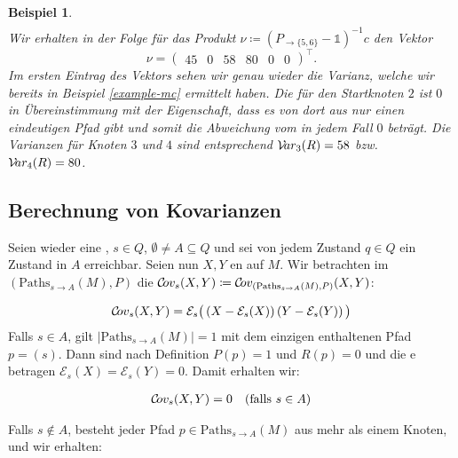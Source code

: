 \documentclass[a4paper]{article}
\newtheorem{beispiel}[satz]{Beispiel}
\theoremstyle{nonumberplain}
\begin{document}
\begin{beispiel}
\begin{align*}
	\end{align*}
	Wir erhalten in der Folge für das Produkt $\nu \coloneqq (P_{\rightarrow \{5,6\}} - \mathbb{1})^{-1}c$ den Vektor
	\begin{equation*}
	\nu = \begin{pmatrix} 45 & 0 & 58 & 80 & 0 & 0 \end{pmatrix}^\intercal\text{.}
	\end{equation*}
	Im ersten Eintrag des Vektors sehen wir genau wieder die Varianz, welche wir bereits in Beispiel \ref{example-mc} ermittelt haben. Die \var{} für den Startknoten $2$ ist $0$ in Übereinstimmung mit der Eigenschaft, dass es von dort aus nur einen eindeutigen Pfad gibt und somit die Abweichung vom \expect{} in jedem Fall $0$ beträgt. Die Varianzen für Knoten $3$ und $4$ sind entsprechend $\mathcal{V}\!ar_3(R) = 58$ bzw. $\mathcal{V}\!ar_4(R) = 80$.
	
\end{beispiel}

\subsection{Berechnung von Kovarianzen}

Seien wieder \mcex{} eine \mc{}, $s \in Q$, $\emptyset \neq A \subseteq Q$ und sei von jedem Zustand $q\in Q$ ein Zustand in $A$ erreichbar. Seien nun $X, Y$ \reward{}en auf $M$. Wir betrachten im \probspacen{} $(\mathrm{Paths}_{s \rightarrow A}(M), P)$ die \cov{} $\mathcal{C}\!ov_s(X,Y) \coloneqq \mathcal{C}\!ov_{(\mathrm{Paths}_{s \rightarrow A}(M), P)}(X,Y)$:

\begin{equation}
\mathcal{C}\!ov_{s}(X,Y) = \mathcal{E}_{s}\big(\left(X - \mathcal{E}_{s} (X)\right)\left(Y - \mathcal{E}_{s} (Y)\right)\big)
\end{equation}
Falls $s \in A$, gilt $|\mathrm{Paths}_{s \rightarrow A}(M)| = 1$ mit dem einzigen enthaltenen Pfad $p = (s)$. Dann sind nach Definition $P(p) = 1$ und $R(p) = 0$ und die \expect{}e betragen $\mathcal{E}_{s}(X) = \mathcal{E}_{s}(Y) = 0$. Damit erhalten wir:

\begin{align}
\mathcal{C}\!ov_{s}(X,Y) = 0 && \text{(falls $s \in A$)}\label{cov_trivial}
\end{align}

Falls $s \notin A$, besteht jeder Pfad $p \in \mathrm{Paths}_{s \rightarrow A}(M)$ aus mehr als einem Knoten, und wir erhalten:
\end{document}
